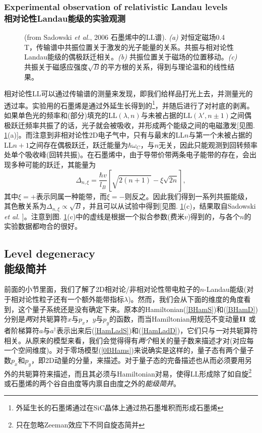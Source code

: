 \documentclass[10pt]{book}
\newcommand{\Pib}{\mbox{\boldmath $\Pi $}}
\newcommand\itt{\it\color{blue}}
\begin{document}
\subsubsection[相对论性Landau能级的实验观测]{Experimental observation of relativistic Landau levels\\\bf 相对论性Landau能级的实验观测}

\begin{figure}
\begin{center}
\end{center}
\caption{ (from Sadowski {\sl et al.}, 2006 石墨烯中的LL谱). {\sl (a)} 对恒定磁场0.4 T，传输谱中共振位置关于激发的光子能量的关系。共振与相对论性Landau能级的偶极跃迁相关。{\sl (b)} 共振位置关于磁场的位置移动。{\sl (c)} 共振关于磁感应强度$\sqrt{B}$的平方根的关系，得到与理论温和的线性结果。 }
\label{fig09bis}
\end{figure}

相对论性LL可以通过传输谱的测量来发现，即我们给样品打光上去，并测量光的透过率。实验用的石墨烯是通过外延生长得到的\footnote{外延生长的石墨烯通过在SiC晶体上通过热石墨堆积而形成石墨烯\cite{berger}}\cite{sadowski}，并随后进行了对衬底的剥离\cite{jiang}。如果单色光的频率和(部分)填充的LL$(\lambda,n)$与未被占据的LL$(\lambda',n\pm 1)$之间偶极跃迁频率共振了的话，光子就会被吸收，并形成两个能级之间的电磁激发[见图. \ref{fig09bis}(a)]。而注意到非相对论性2D电子气中，只有与最末的LL$n$与第一个未被占据的LL$n+1$之间存在偶极跃迁，跃迁能量为$\hbar\omega_C$，与$n$无关，因此只能观测到回转频率处单个吸收峰(回转共振)。在石墨烯中，由于导带价带两条电子能带的存在，会出现多种可能的跃迁，其能量为
\[\Delta_{n,\xi}=\frac{\hbar v}{l_B}\left[\sqrt{2(n+1)}-\xi \sqrt{2n}\right],\]
其中$\xi=+$表示同属一种能带，而$\xi=-$则反之。因此我们得到一系列共振能级，其色散关系为$\Delta_{n,\xi}\propto \sqrt{B}$，并且可以从试验中得到[见图. \ref{fig09bis}(c)，结果取自Sadowski {\sl et al.} \cite{sadowski}]。注意到图. \ref{fig09bis}(c)中的虚线是根据一个拟合参数(费米$v$)得到的，与各个$n$的实验数据都吻合的很好。

\subsection[能级简并]{Level degeneracy\\\bf 能级简并}

前面的小节里面，我们了解了2D相对论/非相对论性带电粒子的$n$-Landau能级(对于相对论性粒子还有一个额外能带指标$\lambda$)。然而，我们会从下面的维度的角度看到，这个量子系统还是没有确定下来。原本的Hamiltonian(\ref{BHamS})和(\ref{BHamD})分别是{\itt 两}对共轭算符$x$与$p_x$，$y$与$p_y$的函数，而当Hamiltonian用规范不变动量$\Pib$ 或者阶梯算符$a$与$a^{\dagger}$表示出来后(\ref{HamLadS})和(\ref{HamLadD})，它们只与{\itt 一}对共轭算符相关。从原来的模型来看，我们会觉得得有{\itt 两个}相关的量子数来描述才对(对应每一个空间维度)。对于零场模型(\ref{0BHams})来说确实是这样的，量子态有两个量子数$p_x$和$p_y$，即2D动量的分量，来描述。对于量子态的完备描述也从而必须要用另外的共轭算符来描述，而且其必须与Hamiltonian对易，使得LL形成除了如自旋\footnote{只在忽略Zeeman效应下不同自旋态简并}或石墨烯的两个谷自由度等内禀自由度之外的{\itt 能级简并}。
\end{document}
